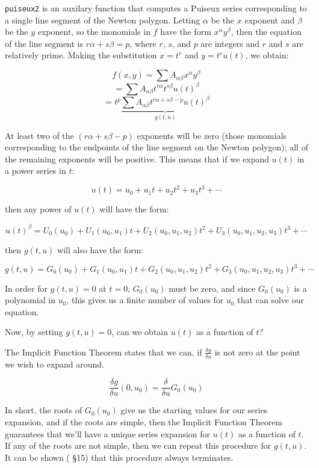 {\tt puiseux2} is an auxilary function that computes a Puiseux series
corresponding to a single line segment of the Newton polygon.  Letting
$\alpha$ be the $x$ exponent and $\beta$ be the $y$ exponent, so the
monomials in $f$ have the form $x^\alpha y^\beta$, then the equation
of the line segment is $r\alpha + s\beta = p$, where $r$, $s$, and $p$
are integers and $r$ and $s$ are relatively prime.  Making the 
substitution $x=t^r$ and $y=t^s u(t)$, we obtain:

$$f(x,y) = \sum A_{\alpha\beta} x^\alpha y^\beta$$
$$ = \sum A_{\alpha\beta} t^{r \alpha} t^{s \beta} u(t)^\beta$$
$$ = t^p \underbrace{\sum A_{\alpha\beta} t^{r \alpha + s \beta - p} u(t)^\beta}_{g(t,u)}$$

At least two of the $(r \alpha + s \beta - p)$ exponents will be zero
(those monomials corresponding to the endpoints of the line segment on
the Newton polygon); all of the remaining exponents will be positive.
This means that if we expand $u(t)$ in a power series in $t$:

$$u(t) = u_0 + u_1 t + u_2 t^2 + u_3 t^3 + \cdots$$

then any power of $u(t)$ will have the form:

$$u(t)^\beta = U_0(u_0) + U_1(u_0, u_1) t + U_2(u_0, u_1, u_2) t^2 + U_3(u_0,u_1,u_2,u_3) t^3 + \cdots$$

then $g(t,u)$ will also have the form:

$$g(t,u) = G_0(u_0) + G_1(u_0, u_1) t + G_2(u_0, u_1, u_2) t^2 + G_3(u_0,u_1,u_2,u_3) t^3 + \cdots$$

In order for $g(t,u)=0$ at $t=0$, $G_0(u_0)$ must be zero, and since $G_0(u_0)$ is a polynomial
in $u_0$, this gives us a finite number of values for $u_0$ that can solve our equation.

Now, by setting $g(t,u)=0$, can we obtain $u(t)$ as a function of $t$?

The Implicit Function Theorem states that we can, if $\frac{\delta g}{\delta u}$ is not zero
at the point we wish to expand around.

$$\frac{\delta g}{\delta u}(0,u_0) = \frac{\delta}{\delta u} G_0(u_0)$$

In short, the roots of $G_0(u_0)$ give us the starting values for our series expansion,
and if the roots are simple, then the Implicit Function Theorem guarantees that we'll
have a unique series expansion for $u(t)$ as a function of $t$.  If any of the roots
are not simple, then we can repeat this procedure for $g(t,u)$.  It can be shown
(\cite{bliss} \S 15) that this procedure always terminates.

